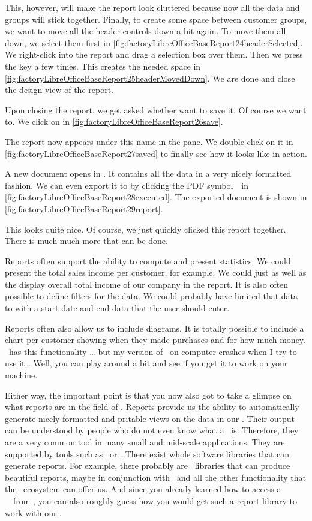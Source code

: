 This, however, will make the report look cluttered because now all the data and groups will stick together.
Finally, to create some space between customer groups, we want to move all the header controls down a bit again.
To move them all down, we select them first in \cref{fig:factoryLibreOfficeBaseReport24headerSelected}.
We right-click into the report and drag a selection box over them.
Then we press the \keys{\arrowkeydown} key a few times.
This creates the needed space in \cref{fig:factoryLibreOfficeBaseReport25headerMovedDown}.
We are done and close the design view of the report.

Upon closing the report, we get asked whether want to save it.
Of course we want to.
We click on  in \cref{fig:factoryLibreOfficeBaseReport26save}.

The report now appears under this name in the  pane.
We double-click on it in \cref{fig:factoryLibreOfficeBaseReport27saved} to finally see how it looks like in action.

A new document opens in \libreofficeWriter.
It contains all the data in a very nicely formatted fashion.
We can even export it to  by clicking the PDF symbol~\libreOfficePdf\ in \cref{fig:factoryLibreOfficeBaseReport28executed}.
The exported  document is shown in \cref{fig:factoryLibreOfficeBaseReport29report}.

This looks quite nice.
Of course, we just quickly clicked this report together.
There is much much more that can be done.

Reports often support the ability to compute and present statistics.
We could present the total sales income per customer, for example.
We could just as well as the display overall total income of our company in the report.
It is also often possible to define filters for the data.
We could probably have limited that data to with a start date and end data that the user should enter.

Reports often also allow us to include diagrams.
It is totally possible to include a chart per customer showing when they made purchases and for how much money.
\libreofficeBase\ has this functionality {\dots} but my version of \libreofficeBase\ on computer crashes when I try to use it{\dots}
Well, you can play around a bit and see if you get it to work on your machine.

Either way, the important point is that you now also got to take a glimpse on what reports are in the field of .
Reports provide us the ability to automatically generate nicely formatted and pritable views on the data in our \db.
Their output can be understood by people who do not even know what a \db\ is.
Therefore, they are a very common tool in many small and mid-scale applications.
They are supported by tools such as \libreofficeBase\ or \microsoftAccess.
There exist whole software libraries that can generate reports.
For example, there probably are \python\ libraries that can produce beautiful reports, maybe in conjunction with \matplotlib\ and all the other functionality that the \python\ ecosystem can offer us.
And since you already learned how to access a \postgresql\ \db\ from \python, you can also roughly guess how you would get such a report library to work with our \db.%
%
\FloatBarrier%
\endhsection%
%
